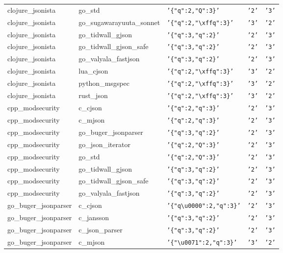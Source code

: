 \documentclass[english, 12pt, a4paper, sci, utf8, a-2b, online]{aaltothesis}
\def\str#1{\texttt{'#1'}}
\begin{document}
\begin{longtable}{lllll}
    clojure\_jsonista & go\_std & \str{\{"q":2,"Q":3\}} & \str{2} & \str{3} \\
    clojure\_jsonista & go\_sugawarayuuta\_sonnet & \str{\{"q":2,"\textbackslash xffq":3\}} & \str{3} & \str{2} \\
    clojure\_jsonista & go\_tidwall\_gjson & \str{\{"q":3,"q":2\}} & \str{2} & \str{3} \\
    clojure\_jsonista & go\_tidwall\_gjson\_safe & \str{\{"q":3,"q":2\}} & \str{2} & \str{3} \\
    clojure\_jsonista & go\_valyala\_fastjson & \str{\{"q":3,"q":2\}} & \str{2} & \str{3} \\
    clojure\_jsonista & lua\_cjson & \str{\{"q":2,"\textbackslash xffq":3\}} & \str{3} & \str{2} \\
    clojure\_jsonista & python\_msgspec & \str{\{"q":2,"\textbackslash xffq":3\}} & \str{3} & \str{2} \\
    clojure\_jsonista & rust\_json & \str{\{"q":2,"\textbackslash xffq":3\}} & \str{3} & \str{2} \\
    cpp\_modsecurity & c\_cjson & \str{\{"q":2,"q":3\}} & \str{2} & \str{3} \\
    cpp\_modsecurity & c\_mjson & \str{\{"q":2,"q":3\}} & \str{2} & \str{3} \\
    cpp\_modsecurity & go\_buger\_jsonparser & \str{\{"q":3,"q":2\}} & \str{2} & \str{3} \\
    cpp\_modsecurity & go\_json\_iterator & \str{\{"q":2,"Q":3\}} & \str{2} & \str{3} \\
    cpp\_modsecurity & go\_std & \str{\{"q":2,"Q":3\}} & \str{2} & \str{3} \\
    cpp\_modsecurity & go\_tidwall\_gjson & \str{\{"q":3,"q":2\}} & \str{2} & \str{3} \\
    cpp\_modsecurity & go\_tidwall\_gjson\_safe & \str{\{"q":3,"q":2\}} & \str{2} & \str{3} \\
    cpp\_modsecurity & go\_valyala\_fastjson & \str{\{"q":3,"q":2\}} & \str{2} & \str{3} \\
    go\_buger\_jsonparser & c\_cjson & \str{\{"q\textbackslash u0000":2,"q":3\}} & \str{2} & \str{3} \\
    go\_buger\_jsonparser & c\_jansson & \str{\{"q":3,"q":2\}} & \str{2} & \str{3} \\
    go\_buger\_jsonparser & c\_json\_parser & \str{\{"q":3,"q":2\}} & \str{2} & \str{3} \\
    go\_buger\_jsonparser & c\_mjson & \str{\{"\textbackslash u0071":2,"q":3\}} & \str{3} & \str{2} \\

\end{longtable}
\end{document}
